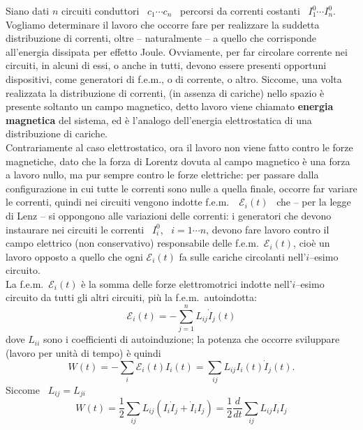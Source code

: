 Siano dati $n$ circuiti conduttori \ $c_1\cdots c_n$ \ percorsi da correnti
costanti \ $I_1^0\cdots I_n^0$. Vogliamo determinare il lavoro che occorre fare
per realizzare la suddetta distribuzione di correnti, oltre -- naturalmente -- a
quello che corrisponde all'energia dissipata per effetto Joule. Ovviamente, per
far circolare corrente nei circuiti, in alcuni di essi, o anche in tutti, devono
essere presenti opportuni dispositivi, come generatori di f.e.m., o di corrente,
o altro. Siccome, una volta realizzata la distribuzione di correnti, (in assenza
di cariche) nello spazio \`e presente soltanto un campo magnetico, detto lavoro
viene chiamato \textbf{energia magnetica} del sistema, ed \`e l'analogo
dell'energia elettrostatica di una distribuzione di cariche.\\
Contrariamente al caso elettrostatico, ora il lavoro non viene fatto contro le
forze magnetiche, dato che la forza di Lorentz dovuta al campo magnetico \`e una
forza a lavoro nullo, ma pur sempre contro le forze elettriche: per passare
dalla configurazione in cui tutte le correnti sono nulle a quella finale,
occorre far variare le correnti, quindi nei circuiti vengono indotte
f.e.m.\ \ $\mathcal E_i(t)$ \ che -- per la legge di Lenz -- si oppongono alle
variazioni delle correnti: i generatori che devono instaurare nei circuiti le
correnti \ $I_i^0$, \ $i=1\cdots n$, devono fare lavoro contro il campo
elettrico (non conservativo) responsabile delle f.e.m.\ $\mathcal E_i(t)$,
cio\`e un lavoro opposto a quello che ogni $\mathcal E_i(t)$ fa sulle cariche
circolanti nell'$i$--esimo circuito.\\
La f.e.m.\ $\mathcal E_i(t)$ \`e la somma delle forze elettromotrici indotte
nell'$i$--esimo circuito da tutti gli altri circuiti, pi\`u la
f.e.m.\ autoindotta:
\begin{equation}
  \mathcal E_i(t)=-\textstyle\sum_{j=1}^nL_{ij}\dot I_j(t)
  \tag{8.39}
\end{equation}
dove $L_{ii}$ sono i coefficienti di autoinduzione; la potenza che occorre
sviluppare (lavoro per unit\`a di tempo) \`e quindi
\begin{equation}
  W(t)=-\textstyle\sum_i\mathcal E_i(t)I_i(t)=\sum_{ij}L_{ij}I_i(t)\dot I_j(t).
  \tag{8.40}
\end{equation}
Siccome \ $L_{ij}=L_{ji}$
\begin{equation}
  W(t)=\frac{1}{2}\textstyle\sum_{ij}L_{ij}(I_i\dot I_j+\dot I_iI_j)
  =\dfrac{1}{2}\dfrac{d}{dt}\sum_{ij}L_{ij}I_iI_j
  \tag{8.41}
\end{equation}
